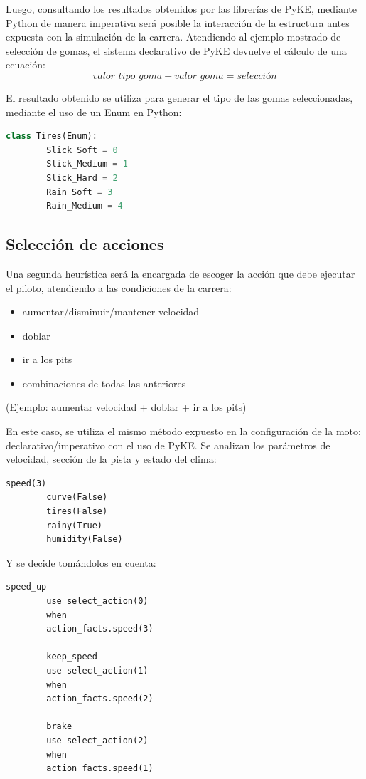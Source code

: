\documentclass[12pt, letterpaper,spanish]{article}
\theoremstyle{definition}
\theoremstyle{remark}
\begin{document}
	Luego, consultando los resultados obtenidos por las librerías de PyKE\cite{pyke}, mediante Python de manera imperativa será posible la interacción de la estructura antes expuesta con la simulación de la carrera.
	Atendiendo al ejemplo mostrado de selección de gomas, el sistema declarativo de PyKE\cite{pyke} devuelve el cálculo de una ecuación:
	$$valor\_tipo\_goma + valor\_goma = selección$$
	
	El resultado obtenido se utiliza para generar el tipo de las gomas seleccionadas, mediante el uso de un Enum en Python:
	\begin{lstlisting}[language={Python}, label={Script}]
		class Tires(Enum):
		Slick_Soft = 0
		Slick_Medium = 1
		Slick_Hard = 2
		Rain_Soft = 3
		Rain_Medium = 4
	\end{lstlisting}
	
	\subsection{Selección de acciones}
	Una segunda heurística será la encargada de escoger la acción que debe ejecutar el piloto, atendiendo a las condiciones de la carrera:
	\begin{itemize}
		\item aumentar/disminuir/mantener velocidad
		\item doblar
		\item ir a los pits
		\item combinaciones de todas las anteriores
	\end{itemize}
	(Ejemplo: aumentar velocidad + doblar + ir a los pits)
	
	En este caso, se utiliza el mismo método expuesto en la configuración de la moto: declarativo/imperativo con el uso de PyKE.
	Se analizan los parámetros de velocidad, sección de la pista y estado del clima:
	\begin{lstlisting}[language={PySharp}, label={Script}]
		speed(3)
		curve(False)
		tires(False)
		rainy(True)
		humidity(False)
	\end{lstlisting}
	
	Y se decide tomándolos en cuenta:
	\begin{lstlisting}[language={PySharp}, label={Script}]
		speed_up
		use select_action(0)
		when
		action_facts.speed(3)
		
		keep_speed
		use select_action(1)
		when
		action_facts.speed(2)
		
		brake
		use select_action(2)
		when
		action_facts.speed(1)
		
	\end{lstlisting}
	
\end{document}
